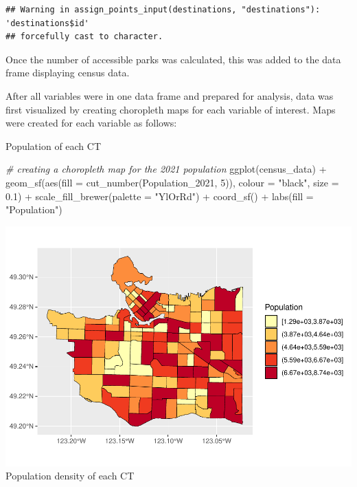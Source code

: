 \documentclass[
]{article}
\newenvironment{Shaded}{\begin{snugshade}}{\end{snugshade}}
\newcommand{\AttributeTok}[1]{\textcolor[rgb]{0.77,0.63,0.00}{#1}}
\newcommand{\CommentTok}[1]{\textcolor[rgb]{0.56,0.35,0.01}{\textit{#1}}}
\newcommand{\DecValTok}[1]{\textcolor[rgb]{0.00,0.00,0.81}{#1}}
\newcommand{\FloatTok}[1]{\textcolor[rgb]{0.00,0.00,0.81}{#1}}
\newcommand{\FunctionTok}[1]{\textcolor[rgb]{0.00,0.00,0.00}{#1}}
\newcommand{\NormalTok}[1]{#1}
\newcommand{\OtherTok}[1]{\textcolor[rgb]{0.56,0.35,0.01}{#1}}
\newcommand{\SpecialCharTok}[1]{\textcolor[rgb]{0.00,0.00,0.00}{#1}}
\newcommand{\StringTok}[1]{\textcolor[rgb]{0.31,0.60,0.02}{#1}}
\begin{document}
\begin{verbatim}
## Warning in assign_points_input(destinations, "destinations"): 'destinations$id'
## forcefully cast to character.
\end{verbatim}

Once the number of accessible parks was calculated, this was added to
the data frame displaying census data.

\begin{Shaded}
\end{Shaded}

After all variables were in one data frame and prepared for analysis,
data was first visualized by creating choropleth maps for each variable
of interest. Maps were created for each variable as follows:

Population of each CT

\begin{Shaded}
\begin{Highlighting}[]
\CommentTok{\# creating a choropleth map for the 2021 population}
\FunctionTok{ggplot}\NormalTok{(census\_data) }\SpecialCharTok{+}
  \FunctionTok{geom\_sf}\NormalTok{(}\FunctionTok{aes}\NormalTok{(}\AttributeTok{fill =} \FunctionTok{cut\_number}\NormalTok{(Population\_2021, }\DecValTok{5}\NormalTok{)),}
          \AttributeTok{colour =} \StringTok{"black"}\NormalTok{,}
          \AttributeTok{size =} \FloatTok{0.1}\NormalTok{) }\SpecialCharTok{+}
  \FunctionTok{scale\_fill\_brewer}\NormalTok{(}\AttributeTok{palette =} \StringTok{"YlOrRd"}\NormalTok{) }\SpecialCharTok{+}
  \FunctionTok{coord\_sf}\NormalTok{() }\SpecialCharTok{+}
  \FunctionTok{labs}\NormalTok{(}\AttributeTok{fill =} \StringTok{"Population"}\NormalTok{)}
\end{Highlighting}
\end{Shaded}

\includegraphics{4GA3Markdown_files/figure-latex/unnamed-chunk-22-1.pdf}
Population density of each CT
\end{document}
